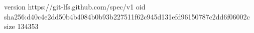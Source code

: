 version https://git-lfs.github.com/spec/v1
oid sha256:d40c4e2dd50b4b4084b0b93b227511f62c945d131efd96150787c2dd6f06002c
size 134353
